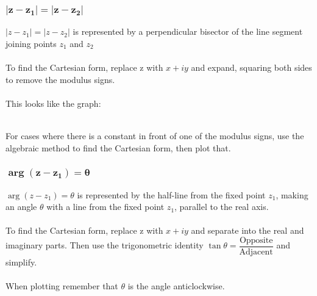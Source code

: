\documentclass{article}[18pt]
\begin{document}
\subsubsection{$\mathbf{|z-z_1|=|z-z_2|}$}
$|z-z_1|=|z-z_2|$ is represented by a perpendicular bisector of the line segment joining points $z_1$ and $z_2$\\
\\
To find the Cartesian form, replace z with $x+iy$ and expand, squaring both sides to remove the modulus signs.\\
\\
This looks like the graph:\\
\\
For cases where there is a constant in front of one of the modulus signs, use the algebraic method to find the Cartesian form, then plot that.
\newpage
\subsubsection{$\mathbf{\arg(z-z_1)=\theta}$}
$\arg(z-z_1)=\theta$ is represented by the half-line from the fixed point $z_1$, making an angle $\theta$ with a line from the fixed point $z_1$, parallel to the real axis.\\
\\
To find the Cartesian form, replace z with $x+iy$ and separate into the real and imaginary parts. Then use the trigonometric identity $\tan\theta=\dfrac{\textrm{Opposite}}{\textrm{Adjacent}}$ and simplify.\\
\\
When plotting remember that $\theta$ is the angle anticlockwise.\\
\end{document}
